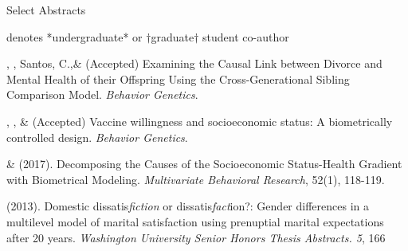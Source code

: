 \begin{rSection}{\textrm{Select Abstracts}}%
\vspace{-1mm}\begin{center}\footnotesize{denotes *undergraduate* or $\dagger$graduate$\dagger$ student co-author}\end{center}\vspace{-1mm}
%
\begin{etaremune}

\item \kl, \jt, Santos, C.,\noteBns \& \meb (Accepted) Examining the Causal Link between Divorce and Mental Health of their Offspring Using the Cross-Generational Sibling Comparison Model. \textit{Behavior Genetics}. 

\item \jt, \kl, \& \meb (Accepted) Vaccine willingness and socioeconomic status: A biometrically controlled design. \textit{Behavior Genetics}. 

\item\meb \& \joe (2017). Decomposing the Causes of the Socioeconomic Status-Health Gradient with Biometrical Modeling. \textit{Multivariate Behavioral Research}, 52(1), 118-119. 

\item\meb (2013). Domestic dissatis{\em fiction} or dissatis{\em fact}ion?: Gender differences in a multilevel model of marital satisfaction using prenuptial marital expectations after 20 years. {\em Washington University Senior Honors Thesis Abstracts. 5}, 166

\end{etaremune}
\end{rSection}